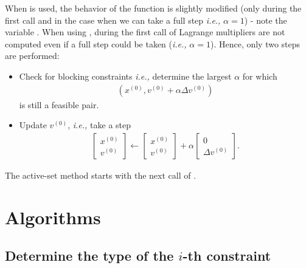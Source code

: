 \documentclass[12pt,a4paper]{article}
\begin{document}
When  is used, the behavior of the function  is
slightly modified (only during the first call and in the case when we can take a full step
\emph{i.e.,} $\alpha = 1$) - note the variable . When using
, during the first call of  Lagrange multipliers are
not computed even if a full step could be taken (\emph{i.e.,} $\alpha = 1$). Hence, only two steps
are performed:
%
\begin{itemize}
\item Check for blocking constraints \emph{i.e.,} determine the largest $\alpha$ for which
  \begin{align*}
  (x^{(0)}, v^{(0)} + \alpha \Delta v^{(0)})
  \end{align*}
  is still a feasible pair.

\item Update $v^{(0)}$, \emph{i.e.,} take a step
  \begin{align*}
    \begin{bmatrix} x^{(0)} \\ v^{(0)} \end{bmatrix} \leftarrow 
    \begin{bmatrix} x^{(0)} \\ v^{(0)} \end{bmatrix} +
    \alpha\begin{bmatrix} 0 \\ \Delta v^{(0)} \end{bmatrix}.
  \end{align*}
\end{itemize}
%
The active-set method starts with the next call of .

\clearpage

\section{Algorithms}

\subsection{Determine the type of the $i$-th constraint}
\end{document}
